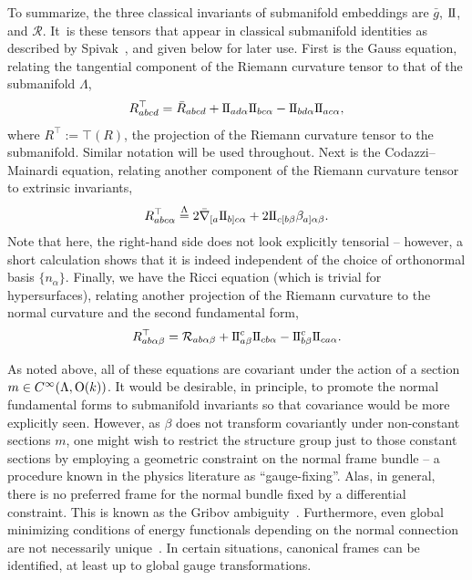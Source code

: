 \documentclass[pdftex]{sigma}
\numberwithin{equation}{section}
\newcommand{\II}{{\rm I\hspace{-.2mm}I}}
\renewcommand{\=}{\stackrel \Lambda =}
\begin{document}
To summarize, the three classical invariants of submanifold embeddings are $\bar{g}$, $\II$, and $\mathcal{R}$. It~is these tensors that appear in classical submanifold identities as described by Spivak~\cite{Spivak}, and given below for later use. First is the Gauss equation, relating the tangential component of the Riemann curvature tensor to that of the submanifold $\Lambda$,
\begin{align} \label{gauss-equation}
R_{abcd}^\top = \bar{R}_{abcd} + \II_{ad \alpha} \II_{bc \alpha} - \II_{bd \alpha} \II_{ac \alpha} ,
\end{align}
where $R^\top := \top (R)$, the projection of the Riemann curvature tensor to the submanifold. Similar notation will be used throughout.
Next is the Codazzi--Mainardi equation, relating another component of the Riemann curvature tensor to extrinsic invariants,
\begin{align} \label{codazzi}
R_{abc \alpha}^\top \= 2\bar{\nabla}_{[a} \II_{b]c \alpha} + 2\II_{c[b \beta} \beta_{a] \alpha \beta} .
\end{align}
Note that here, the right-hand side does not look explicitly tensorial -- however, a short calculation shows that it is indeed independent of the choice of orthonormal basis $\{n_{\alpha}\}$. Finally, we have the Ricci equation (which is trivial for hypersurfaces), relating another projection of the Riemann curvature to the normal curvature and the second fundamental form,
\[
R_{ab \alpha \beta}^\top = \mathcal{R}_{ab \alpha \beta} + \II^c_{a \beta} \II_{cb \alpha} - \II^c_{b \beta} \II_{ca \alpha} .
\]

As noted above, all of these equations are covariant under the action of a section $m \in C^\infty(\Lambda,{\rm O}(k))$. It would be desirable, in principle, to promote the normal fundamental forms to submanifold invariants so that covariance would be more explicitly seen. However, as $\beta$ does not transform covariantly under non-constant sections $m$, one might wish to restrict the structure group just to those constant sections by employing a geometric constraint on the normal frame bundle -- a procedure known in the physics literature as ``gauge-fixing''. Alas, in general, there is no preferred frame for the normal bundle fixed by a differential constraint. This is known as the Gribov ambiguity~\cite{gribov1978}. Furthermore, even global minimizing conditions of energy functionals depending on the normal connection are not necessarily unique~\cite{vanBaal1992}. In certain situations, canonical frames can be identified, at least up to global gauge transformations.
\end{document}
